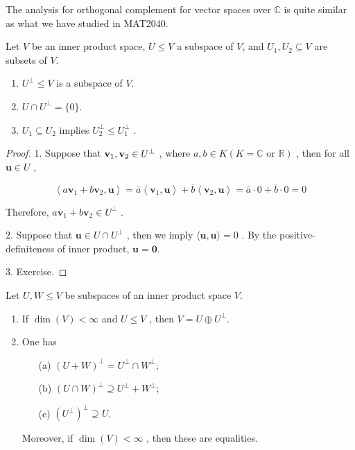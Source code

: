 The analysis for orthogonal complement for vector spaces over \(\mathbb{C}\) is quite similar as what we have studied in MAT2040.

\begin{proposition} 
Let $V$ be an inner product space, $U \leq V$ a subspace of $V$, and $U_1, U_2 \subseteq V$ are subsets of $V$.
\begin{enumerate}
    \item ${U}^{\perp} \leq V$ is a subspace of \(V\).
    \item \(U \cap  {U}^{\perp} = \{ 0\}\).
    \item \({U}_{1} \subseteq  {U}_{2}\) implies \({U}_{2}^{\perp} \leq  {U}_{1}^{\perp}\) .
\end{enumerate}
\end{proposition}

\begin{proof} 
1. Suppose that \({\bf v}_{1},{\bf v}_{2} \in  {U}^{\perp}\) , where \(a,b \in  K\left( {K = \mathbb{C}\text{ or }\mathbb{R}}\right)\) , then for all \(\mathbf{u} \in  U\) ,

\[
\left\langle  {a{\mathbf{v}}_{1} + b{\mathbf{v}}_{2},\mathbf{u}}\right\rangle   = \bar{a}\left\langle  {{\mathbf{v}}_{1},\mathbf{u}}\right\rangle   + \bar{b}\left\langle  {{\mathbf{v}}_{2},\mathbf{u}}\right\rangle
= \bar{a} \cdot  0 + \bar{b} \cdot  0 = 0
\]

Therefore, \(a{\mathbf{v}}_{1} + b{\mathbf{v}}_{2} \in  {U}^{\perp}\) .

2. Suppose that \(\mathbf{u} \in  U \cap  {U}^{\perp}\) , then we imply \(\langle \mathbf{u},\mathbf{u}\rangle  = 0\) . By the positive-definiteness of inner product, \(\mathbf{u} = \mathbf{0}\).

3. Exercise.
\end{proof}

\begin{proposition} \label{prop:orthogonal_comple}
Let $U, W \leq V$ be subspaces of an inner product space $V$.
\begin{enumerate}
    \item If \(\dim \left( V\right)  < \infty\) and \(U \leq  V\) , then \(V = U \oplus  {U}^{\perp}\).
    \item One has
\begin{enumerate}
    \item[(a)] ${\left( U + W\right) }^{\perp} = {U}^{\perp} \cap  {W}^{\perp}$;
    \item[(b)] ${\left( U \cap  W\right) }^{\perp} \supseteq  {U}^{\perp} + {W}^{\perp}$;
    \item[(c)] ${\left( {U}^{\perp}\right) }^{\perp} \supseteq  U$. 
\end{enumerate}
Moreover, if \(\dim \left( V\right)  < \infty\) , then these are equalities.
\end{enumerate}
\end{proposition}


